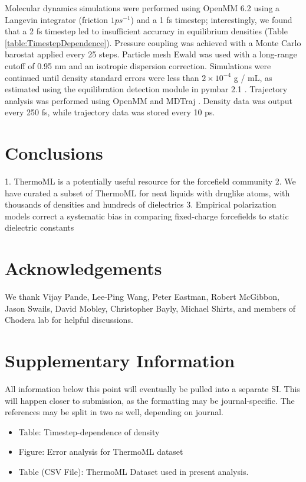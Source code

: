 \documentclass[journal=jacsat,manuscript=article]{achemso}
\begin{document}
Molecular dynamics simulations were performed using OpenMM 6.2 using a Langevin integrator (friction $1 ps^{-1}$) and a 1 fs timestep; interestingly, we found that a 2 fs timestep led to insufficient accuracy in equilibrium densities (Table \ref{table:TimestepDependence}).  Pressure coupling was achieved with a Monte Carlo barostat applied every 25 steps.  Particle mesh Ewald \cite{Darden1993} was used with a long-range cutoff of 0.95 nm and an isotropic dispersion correction.  Simulations were continued until density standard errors were less than $2 \times 10^{-4}$ g / mL, as estimated using the equilibration detection module in pymbar 2.1 \cite{shirts2008statistically}.  Trajectory analysis was performed using OpenMM \cite{eastman2012openmm} and MDTraj \cite{mcgibbon2014mdtraj}.  Density data was output every 250 fs, while trajectory data was stored every 10 ps.  

\section{Conclusions}

1.  ThermoML is a potentially useful resource for the forcefield community
2.  We have curated a subset of ThermoML for neat liquids with druglike atoms, with thousands of densities and hundreds of dielectrics
3.  Empirical polarization models correct a systematic bias in comparing fixed-charge forcefields to static dielectric constants


\section{Acknowledgements}

We thank Vijay Pande, Lee-Ping Wang, Peter Eastman, Robert McGibbon, Jason Swails, David Mobley, Christopher Bayly, Michael Shirts, and members of Chodera lab for helpful discussions.  



\clearpage


\section{Supplementary Information}

All information below this point will eventually be pulled into a separate SI.  This will happen closer to submission, as the formatting may be journal-specific.  The references may be split in two as well, depending on journal.

\begin{itemize}
 \item Table: Timestep-dependence of density
 \item Figure: Error analysis for ThermoML dataset
 \item Table (CSV File): ThermoML Dataset used in present analysis.
\end{itemize}
\end{document}
